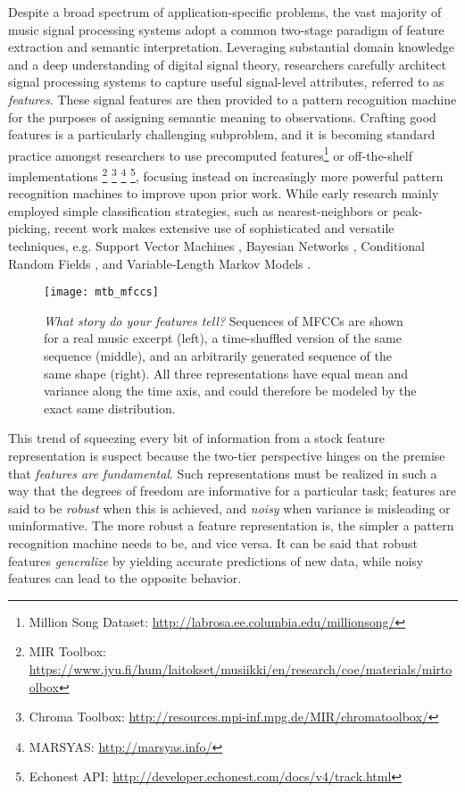 Despite a broad spectrum of application-specific problems, the vast majority of music signal processing systems adopt a common two-stage paradigm of feature extraction and semantic interpretation.
Leveraging substantial domain knowledge and a deep understanding of digital signal theory, researchers carefully architect signal processing systems to capture useful signal-level attributes, referred to as \emph{features}.
These signal features are then provided to a pattern recognition machine for the purposes of assigning semantic meaning to observations.
Crafting good features is a particularly challenging subproblem, and it is becoming standard practice amongst researchers to use precomputed features\footnote{Million Song Dataset: \url{http://labrosa.ee.columbia.edu/millionsong/}} or off-the-shelf implementations
\footnote{MIR Toolbox: \url{https://www.jyu.fi/hum/laitokset/musiikki/en/research/coe/materials/mirtoolbox}}
\footnote{Chroma Toolbox: \url{http://resources.mpi-inf.mpg.de/MIR/chromatoolbox/}}
\footnote{MARSYAS: \url{http://marsyas.info/}}
\footnote{Echonest API: \url{http://developer.echonest.com/docs/v4/track.html}},
focusing instead on increasingly more powerful pattern recognition machines to improve upon prior work.
While early research mainly employed simple classification strategies, such as nearest-neighbors or peak-picking, recent work makes extensive use of sophisticated and versatile techniques, e.g. Support Vector Machines \cite{Mandel2005Song}, Bayesian Networks \cite{Mauch2010Approximate}, Conditional Random Fields \cite{Sumi2012Music}, and Variable-Length Markov Models \cite{Chordia2011Predictive}.

\begin{figure}
\begin{centering}
\texttt{[image: mtb\_mfccs]}
\caption{\emph{What story do your features tell?} Sequences of MFCCs are shown for a real music excerpt (left), a time-shuffled version of the same sequence (middle), and an arbitrarily generated sequence of the same shape (right). All three representations have equal mean and variance along the time axis, and could therefore be modeled by the exact same distribution.}
\label{fig:mfccs}
\end{centering}
\end{figure}

This trend of squeezing every bit of information from a stock feature representation is suspect because the two-tier perspective hinges on the premise that \emph{features are fundamental}.
Such representations must be realized in such a way that the degrees of freedom are informative for a particular task; features are said to be \emph{robust} when this is achieved, and \emph{noisy} when variance is misleading or uninformative.
The more robust a feature representation is, the simpler a pattern recognition machine needs to be, and vice versa.
It can be said that robust features \emph{generalize} by yielding accurate predictions of new data, while noisy features can lead to the opposite behavior.


